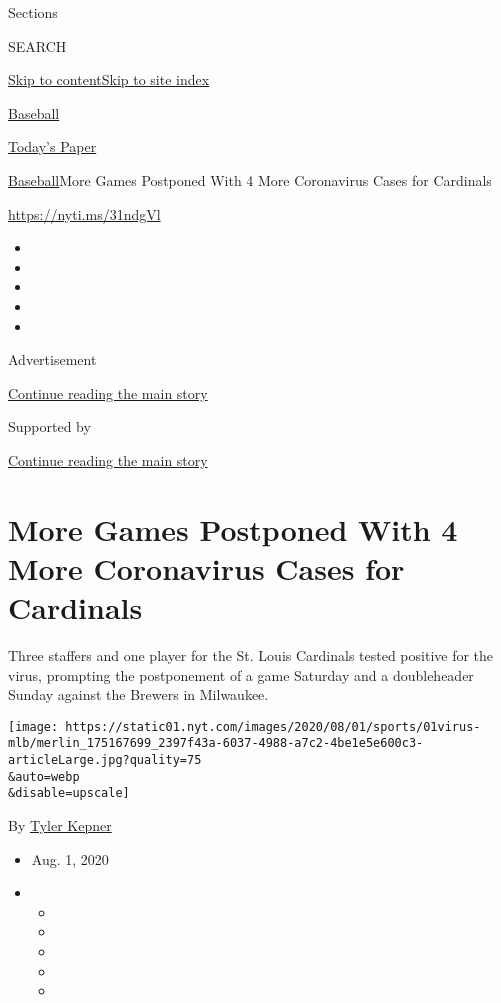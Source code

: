 Sections

SEARCH

\protect\hyperlink{site-content}{Skip to
content}\protect\hyperlink{site-index}{Skip to site index}

\href{https://www.nytimes.com/section/sports/baseball}{Baseball}

\href{https://myaccount.nytimes.com/auth/login?response_type=cookie\&client_id=vi}{}

\href{https://www.nytimes.com/section/todayspaper}{Today's Paper}

\href{/section/sports/baseball}{Baseball}\textbar{}More Games Postponed
With 4 More Coronavirus Cases for Cardinals

\url{https://nyti.ms/31ndgVl}

\begin{itemize}
\item
\item
\item
\item
\item
\end{itemize}

Advertisement

\protect\hyperlink{after-top}{Continue reading the main story}

Supported by

\protect\hyperlink{after-sponsor}{Continue reading the main story}

\hypertarget{more-games-postponed-with-4-more-coronavirus-cases-for-cardinals}{%
\section{More Games Postponed With 4 More Coronavirus Cases for
Cardinals}\label{more-games-postponed-with-4-more-coronavirus-cases-for-cardinals}}

Three staffers and one player for the St. Louis Cardinals tested
positive for the virus, prompting the postponement of a game Saturday
and a doubleheader Sunday against the Brewers in Milwaukee.

\texttt{[image: https://static01.nyt.com/images/2020/08/01/sports/01virus-mlb/merlin\_175167699\_2397f43a-6037-4988-a7c2-4be1e5e600c3-articleLarge.jpg?quality=75\\\&auto=webp\\\&disable=upscale]}

By \href{https://www.nytimes.com/by/tyler-kepner}{Tyler Kepner}

\begin{itemize}
\item
  Aug. 1, 2020
\item
  \begin{itemize}
  \item
  \item
  \item
  \item
  \item
  \end{itemize}
\end{itemize}

